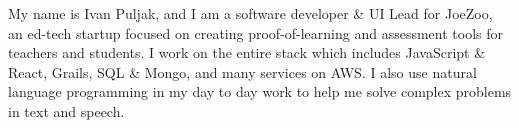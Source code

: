 

\begin{cvparagraph}

My name is Ivan Puljak, and I am a software developer \& UI Lead for JoeZoo, an ed-tech startup focused on creating proof-of-learning and assessment tools for teachers and students.
I work on the entire stack which includes JavaScript \& React, Grails, SQL \& Mongo, and many services on AWS.
I also use natural language programming in my day to day work to help me solve complex problems in text and speech.

\end{cvparagraph}
